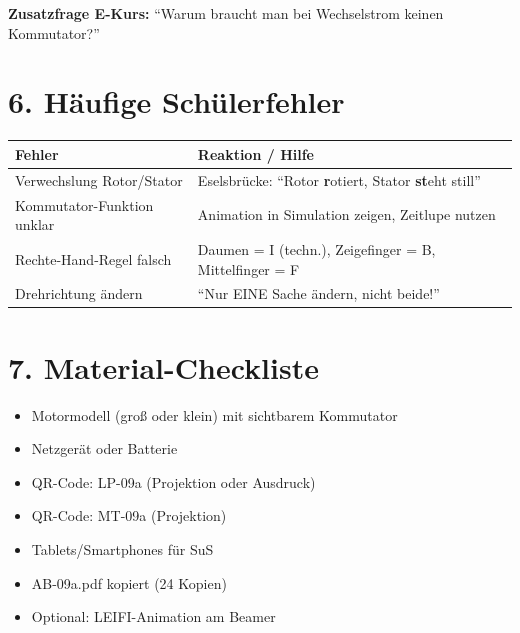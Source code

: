 \documentclass[11pt, a4paper]{article}
\newcommand{\stession}{09a}
\newcommand{\lerngruppengroesse}{24}
\begin{document}
\vspace{1em}

\textbf{Zusatzfrage E-Kurs:} ``Warum braucht man bei Wechselstrom keinen Kommutator?''


\section*{6. Häufige Schülerfehler}

\begin{warnbox}
\begin{tabular}{|p{4.5cm}|p{9cm}|}
\hline
\textbf{Fehler} & \textbf{Reaktion / Hilfe} \\
\hline
Verwechslung Rotor/Stator & Eselsbrücke: ``Rotor \textbf{r}otiert, Stator \textbf{st}eht still'' \\
\hline
Kommutator-Funktion unklar & Animation in Simulation zeigen, Zeitlupe nutzen \\
\hline
Rechte-Hand-Regel falsch & Daumen = I (techn.), Zeigefinger = B, Mittelfinger = F \\
\hline
Drehrichtung ändern & ``Nur EINE Sache ändern, nicht beide!'' \\
\hline
\end{tabular}
\end{warnbox}


\section*{7. Material-Checkliste}

\begin{itemize}
    \item[$\Box$] Motormodell (groß oder klein) mit sichtbarem Kommutator
    \item[$\Box$] Netzgerät oder Batterie
    \item[$\Box$] QR-Code: LP-\stession{} (Projektion oder Ausdruck)
    \item[$\Box$] QR-Code: MT-\stession{} (Projektion)
    \item[$\Box$] Tablets/Smartphones für SuS
    \item[$\Box$] AB-\stession.pdf kopiert (\lerngruppengroesse{} Kopien)
    \item[$\Box$] Optional: LEIFI-Animation am Beamer
\end{itemize}
\end{document}
